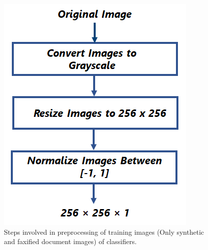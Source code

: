 \begin{figure}[H]
        \begin{center}
	    \includegraphics[scale=0.55]{images/Implementation/ClassifierPreprocessing.png}
	    \caption[Steps involved in preprocessing of training images (Only synthetic and faxified document images) of classifiers.]{Steps involved in preprocessing of training images (Only synthetic and faxified document images) of classifiers.}
	    \label{fig:PreprocessingClassfier}
	    \end{center}
\end{figure}










































